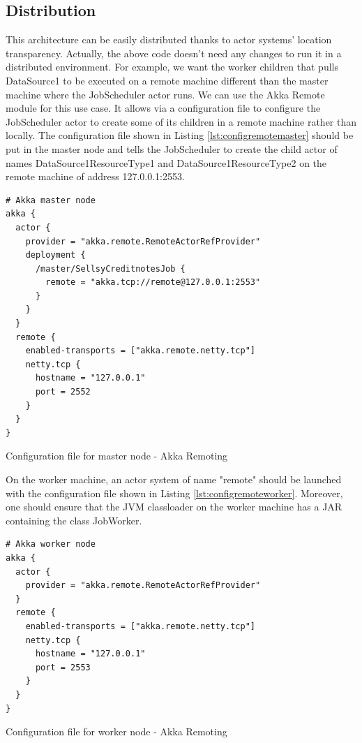 \subsection{Distribution}

This architecture can be easily distributed thanks to actor systems' location transparency. Actually, the above code doesn't need any changes to run it in a distributed
environment. 
For example, we want the worker children that pulls DataSource1 to be executed on a remote machine different than the master machine where the JobScheduler actor runs.
We can use the Akka Remote module  for this use case. It allows via a configuration file to configure the JobScheduler actor to create some
of its children in a remote machine rather than locally. The configuration file shown in Listing \ref{lst:configremotemaster} should be put in the master node and 
tells the JobScheduler to create the child actor of names DataSource1ResourceType1 and DataSource1ResourceType2 on the remote machine of address 127.0.0.1:2553.

\begin{listing}[h]
\begin{verbatim}
# Akka master node
akka {
  actor {
    provider = "akka.remote.RemoteActorRefProvider"
    deployment {
      /master/SellsyCreditnotesJob {
        remote = "akka.tcp://remote@127.0.0.1:2553"
      }
    }
  }
  remote {
    enabled-transports = ["akka.remote.netty.tcp"]
    netty.tcp {
      hostname = "127.0.0.1"
      port = 2552
    }
  }
}
\end{verbatim}
\caption{Configuration file for master node - Akka Remoting}
\label{lst:configremotemaster}
\end{listing}

On the worker machine, an actor system of name "remote" should be launched with the configuration file shown in Listing \ref{lst:configremoteworker}. Moreover,
one should ensure that the JVM classloader on the worker machine has a JAR containing the class JobWorker.

\begin{listing}[h]
\begin{verbatim}
# Akka worker node
akka {
  actor {
    provider = "akka.remote.RemoteActorRefProvider"
  }
  remote {
    enabled-transports = ["akka.remote.netty.tcp"]
    netty.tcp {
      hostname = "127.0.0.1"
      port = 2553
    }
  }
}  
\end{verbatim}
\caption{Configuration file for worker node - Akka Remoting}
\label{lst:configremoteworker}
\end{listing}


